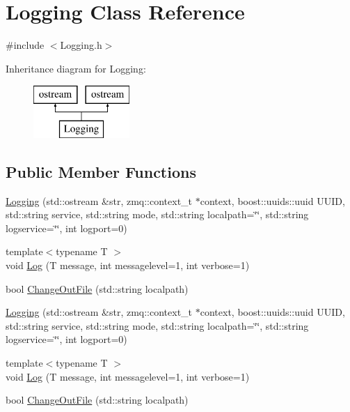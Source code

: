 \hypertarget{classLogging}{\section{Logging Class Reference}
\label{classLogging}
}


{\ttfamily \#include $<$Logging.\-h$>$}

Inheritance diagram for Logging\-:\begin{figure}[H]
\begin{center}
\leavevmode
\includegraphics[height=2.000000cm]{classLogging}
\end{center}
\end{figure}
\subsection*{Public Member Functions}
\begin{DoxyCompactItemize}
\item 
\hyperlink{classLogging_ae7cc7299c697019f273b75cbfefff848}{Logging} (std\-::ostream \&str, zmq\-::context\-\_\-t $\ast$context, boost\-::uuids\-::uuid U\-U\-I\-D, std\-::string service, std\-::string mode, std\-::string localpath=\char`\"{}\char`\"{}, std\-::string logservice=\char`\"{}\char`\"{}, int logport=0)
\item 
{\footnotesize template$<$typename T $>$ }\\void \hyperlink{classLogging_af7839ee68729b066da269cc012b1fcc9}{Log} (T message, int messagelevel=1, int verbose=1)
\item 
bool \hyperlink{classLogging_a7a0c89c152ad81fb41a849ed9d81e429}{Change\-Out\-File} (std\-::string localpath)
\item 
\hyperlink{classLogging_ae7cc7299c697019f273b75cbfefff848}{Logging} (std\-::ostream \&str, zmq\-::context\-\_\-t $\ast$context, boost\-::uuids\-::uuid U\-U\-I\-D, std\-::string service, std\-::string mode, std\-::string localpath=\char`\"{}\char`\"{}, std\-::string logservice=\char`\"{}\char`\"{}, int logport=0)
\item 
{\footnotesize template$<$typename T $>$ }\\void \hyperlink{classLogging_af7839ee68729b066da269cc012b1fcc9}{Log} (T message, int messagelevel=1, int verbose=1)
\item 
bool \hyperlink{classLogging_a7a0c89c152ad81fb41a849ed9d81e429}{Change\-Out\-File} (std\-::string localpath)
\end{DoxyCompactItemize}
